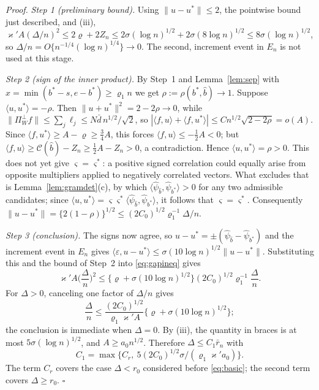 \documentclass[12pt, a4paper]{article}
\newcommand{\qed}{\hfill$\square$}
\newenvironment{proof}[1][Proof]{\par\noindent\textit{#1.}\space}{\qed\par\medskip}
\begin{document}
\begin{proof}
\emph{Step 1 (preliminary bound).} Using $\|u-u^*\| \le 2$, the pointwise bound just described, and (iii), $\varkappa' A(\Delta/n)^2 \le 2\varrho + 2Z_n \le 2\sigma(\log n)^{1/2} + 2\sigma(8\log n)^{1/2} \le 8\sigma(\log n)^{1/2}$, so $\Delta/n = O\{n^{-1/4}(\log n)^{1/4}\} \to 0$. The second, increment event in $E_n$ is not used at this stage.

\emph{Step 2 (sign of the inner product).} By Step~1 and Lemma~\ref{lem:sep} with $x = \min(b^*-s,e-b^*) \ge \varrho_1 n$ we get $\rho := \rho(b^*,\hat b) \to 1$. Suppose $\langle u,u^*\rangle = -\rho$. Then $\|u+u^*\|^2 = 2-2\rho \to 0$, while $\|\Pi^\perp_W f\| \le \sum_j \ell_j \le N\bar d\, n^{1/2}/\sqrt2$, so
$|\langle f,u\rangle + \langle f,u^*\rangle| \le Cn^{1/2}\sqrt{2-2\rho} =
o(A)$. Since $\langle f,u^*\rangle \ge A - \varrho \ge \tfrac34 A$, this forces
$\langle f,u\rangle \le -\tfrac12 A < 0$; but
$\langle f,u\rangle \ge \mathcal{C}(\hat b) - Z_n \ge \tfrac12 A - Z_n > 0$, a
contradiction. Hence $\langle u,u^*\rangle = \rho > 0$. This does not yet give $\varsigma = \varsigma^*$: a positive signed correlation could equally arise from opposite multipliers applied to negatively correlated vectors. What excludes that is Lemma~\ref{lem:gramdet}(c), by which $\langle\hat\psi_{\hat b},\hat\psi_{b^*}\rangle > 0$ for any two admissible candidates; since $\langle u,u^*\rangle = \varsigma\varsigma^*\langle\hat\psi_{\hat b},\hat\psi_{b^*}\rangle$, it follows that $\varsigma = \varsigma^*$. Consequently $\|u-u^*\| = \{2(1-\rho)\}^{1/2} \le (2C_0)^{1/2}\varrho_1^{-1}\Delta/n$.

\emph{Step 3 (conclusion).} The signs now agree, so
$u-u^*=\pm(\hat\psi_{\hat b}-\hat\psi_{b^*})$ and the increment event in
$E_n$ gives
$\langle\varepsilon,u-u^*\rangle
\le\sigma(10\log n)^{1/2}\|u-u^*\|$. Substituting this and the bound of
Step~2 into \eqref{eq:gapineq} gives
\[
\varkappa' A\Big(\frac{\Delta}{n}\Big)^2
\le \big\{\varrho+\sigma(10\log n)^{1/2}\big\}
(2C_0)^{1/2}\varrho_1^{-1}\frac{\Delta}{n}.
\]
For $\Delta>0$, canceling one factor of $\Delta/n$ gives
\[
\frac{\Delta}{n}
\le\frac{(2C_0)^{1/2}}{\varrho_1\varkappa' A}
\big\{\varrho+\sigma(10\log n)^{1/2}\big\};
\]
the conclusion is immediate when $\Delta=0$. By (iii), the quantity in braces
is at most $5\sigma(\log n)^{1/2}$, and $A\ge a_0n^{1/2}$. Therefore
$\Delta\le C_1\bar r_n$ with
\[
C_1=\max\{C_r,\ 5(2C_0)^{1/2}\sigma/(\varrho_1\varkappa'a_0)\}.
\]
The term $C_r$ covers the case $\Delta<r_0$ considered before
\eqref{eq:basic}; the second term covers $\Delta\ge r_0$.
\end{proof}
\end{document}
